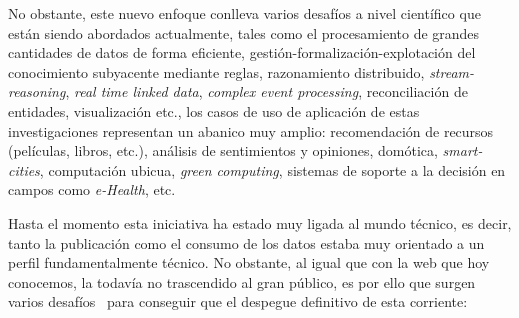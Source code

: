 No obstante, este nuevo enfoque conlleva varios desafíos a nivel científico que están siendo
abordados actualmente, tales como el procesamiento de grandes cantidades de
datos de forma eficiente, gestión-formalización-explotación del conocimiento
subyacente mediante reglas, razonamiento distribuido, \textit{stream-reasoning}, \textit{real
time linked data}, \textit{complex event processing}, reconciliación de entidades,
visualización etc., los casos de uso de aplicación de estas investigaciones representan un abanico muy amplio: recomendación de recursos
(películas, libros, etc.), análisis de sentimientos y opiniones, domótica,
\textit{smart-cities}, computación ubicua, \textit{green computing}, sistemas de soporte a la
decisión en campos como \textit{e-Health}, etc.

Hasta el momento esta iniciativa ha estado muy ligada al mundo técnico, es decir, tanto la publicación como el 
consumo de los datos estaba muy orientado a un perfil fundamentalmente técnico. No obstante, al igual que con la web que hoy conocemos, 
la \wod todavía no trascendido al gran público, es por ello que surgen varios desafíos~\cite{DBLP:journals/semweb/DadzieR11} para conseguir que el despegue definitivo 
de esta corriente:

